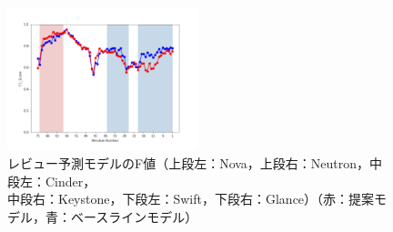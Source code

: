 \documentclass[submit]{ipsj}
\begin{document}
\begin{figure}[t]
\begin{center}
    \includegraphics[width=0.495\textwidth]{Uenaka_fig/RQ2_result/Glance/Glance_review_F1.pdf}
    \caption{レビュー予測モデルのF値（上段左：Nova，上段右：Neutron，中段左：Cinder，\\ 中段右：Keystone，下段左：Swift，下段右：Glance）（赤：提案モデル，青：ベースラインモデル）}
    \label{fig:review_f}
\end{center}
\end{figure}



\end{document}
